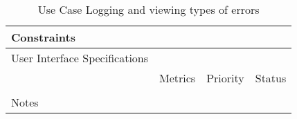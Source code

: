 \begin{table}[H]
\begin{tabularx}{\linewidth}{|l|X|X|X|}
    \hline Constraints                   & \multicolumn{3}{l|}{}                                                                                 \\

    \hline User Interface Specifications & \multicolumn{3}{l|}{}                                                                                 \\

    \hline \multirow{2}{*}{}             & Metrics                                                                           & Priority & Status \\
    \cline{2-4}                          &                                                                                   &          &        \\
    \hline Notes                         & \multicolumn{3}{l|}{}                                                                                 \\
    \hline
  \end{tabularx}
  \caption{Use Case Logging and viewing types of errors}
  \label{tab:use_case_;ogging_and_viewing_types_of_errors}
\end{table}

